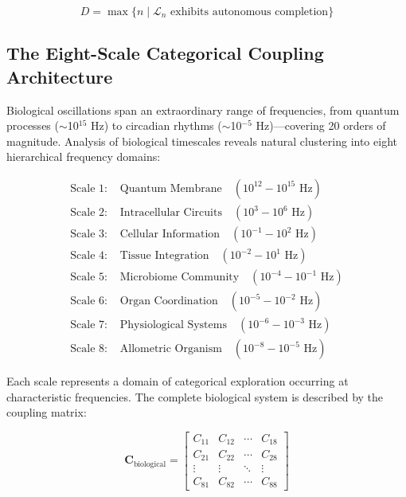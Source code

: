 \documentclass[11pt]{article}
\begin{document}
\begin{equation}
D = \max\{n \mid \mathcal{L}_n \text{ exhibits autonomous completion}\}
\end{equation}

\subsection{The Eight-Scale Categorical Coupling Architecture}

Biological oscillations span an extraordinary range of frequencies, from quantum processes ($\sim$10$^{15}$ Hz) to circadian rhythms ($\sim$10$^{-5}$ Hz)—covering 20 orders of magnitude. Analysis of biological timescales reveals natural clustering into eight hierarchical frequency domains:

\begin{align}
\text{Scale 1: } &\text{Quantum Membrane} \quad (10^{12}-10^{15} \text{ Hz}) \label{eq:scale1} \\
\text{Scale 2: } &\text{Intracellular Circuits} \quad (10^3-10^6 \text{ Hz}) \label{eq:scale2} \\
\text{Scale 3: } &\text{Cellular Information} \quad (10^{-1}-10^2 \text{ Hz}) \label{eq:scale3} \\
\text{Scale 4: } &\text{Tissue Integration} \quad (10^{-2}-10^1 \text{ Hz}) \label{eq:scale4} \\
\text{Scale 5: } &\text{Microbiome Community} \quad (10^{-4}-10^{-1} \text{ Hz}) \label{eq:scale5} \\
\text{Scale 6: } &\text{Organ Coordination} \quad (10^{-5}-10^{-2} \text{ Hz}) \label{eq:scale6} \\
\text{Scale 7: } &\text{Physiological Systems} \quad (10^{-6}-10^{-3} \text{ Hz}) \label{eq:scale7} \\
\text{Scale 8: } &\text{Allometric Organism} \quad (10^{-8}-10^{-5} \text{ Hz}) \label{eq:scale8}
\end{align}

Each scale represents a domain of categorical exploration occurring at characteristic frequencies. The complete biological system is described by the coupling matrix:

\begin{equation}
\mathbf{C}_{\text{biological}} = \begin{bmatrix}
C_{11} & C_{12} & \cdots & C_{18} \\
C_{21} & C_{22} & \cdots & C_{28} \\
\vdots & \vdots & \ddots & \vdots \\
C_{81} & C_{82} & \cdots & C_{88}
\end{bmatrix}
\end{equation}
\end{document}
